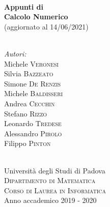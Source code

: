 \documentclass[12pt,a4paper,headings=optiontohead]{scrbook}
\begin{document}
\begin{titlepage}
\HRule \\[0.4cm]
{ \huge \bfseries Appunti di}\\
{ \huge \bfseries Calcolo Numerico\\[0.15 cm]} %
{ \Large (aggiornato al 14/06/2021)\\[0.15 cm]} %
\HRule \\[1.5cm]
 

\begin{minipage}{0.4\textwidth}
\begin{flushleft} \large
\emph{\Large{Autori:}}\\
\quad \quad Michele \textsc{Veronesi}\\
\quad \quad Silvia \textsc{Bazzeato}\\
\quad \quad Simone \textsc{De Renzis}\\
\quad \quad Michele \textsc{Baldisseri}\\
\quad \quad Andrea \textsc{Cecchin}\\
\quad \quad Stefano \textsc{Rizzo}\\
\quad \quad Leonardo \textsc{Tredese}\\
\quad \quad Alessandro \textsc{Pirolo}\\
\quad \quad Filippo \textsc{Pinton}
\end{flushleft}

\end{minipage}\\[2cm]


\LARGE Università degli Studi di Padova\\[0.4cm] %
\textsc{\large Dipartimento di Matematica}\\[0.05cm]
\textsc{\large Corso di Laurea in Informatica}\\[1cm] %

{\Large Anno accademico 2019 - 2020}\\[2cm] %

\vfill %

\end{titlepage}
\end{document}
